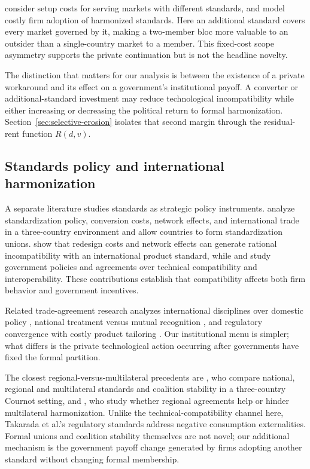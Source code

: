 \citet{fischerSerra2000} consider setup costs for serving markets with different standards, and \citet{schmidtSteingress2022} model costly firm adoption of harmonized standards. Here an additional standard covers every market governed by it, making a two-member bloc more valuable to an outsider than a single-country market to a member. This fixed-cost scope asymmetry supports the private continuation but is not the headline novelty.

The distinction that matters for our analysis is between the existence of a private workaround and its effect on a government's institutional payoff. A converter or additional-standard investment may reduce technological incompatibility while either increasing or decreasing the political return to formal harmonization. Section~\ref{sec:selective-erosion} isolates that second margin through the residual-rent function $R(d,v)$.

\subsection{Standards policy and international harmonization}
\label{subsec:lit-government-standards}

A separate literature studies standards as strategic policy instruments. \citet{gandalShy2001} analyze standardization policy, conversion costs, network effects, and international trade in a three-country environment and allow countries to form standardization unions. \citet{barrettYang2001} show that redesign costs and network effects can generate rational incompatibility with an international product standard, while \citet{klimenko2009} and \citet{klimenkoInteroperability2009} study government policies and agreements over technical compatibility and interoperability. These contributions establish that compatibility affects both firm behavior and government incentives.

Related trade-agreement research analyzes international disciplines over domestic policy \citep{bagwellStaiger2001}, national treatment versus mutual recognition \citep{costinot2008,geng2019}, and regulatory convergence with costly product tailoring \citep{grossmanMcCalmanStaiger2021}. Our institutional menu is simpler; what differs is the private technological action occurring after governments have fixed the formal partition.

The closest regional-versus-multilateral precedents are \citet{takaradaEtAl2020}, who compare national, regional and multilateral standards and coalition stability in a three-country Cournot setting, and \citet{kawabataTakarada2021}, who study whether regional agreements help or hinder multilateral harmonization. Unlike the technical-compatibility channel here, Takarada et al.'s regulatory standards address negative consumption externalities. Formal unions and coalition stability themselves are not novel; our additional mechanism is the government payoff change generated by firms adopting another standard without changing formal membership.

